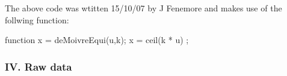 The above code was wtitten 15/10/07 by J Fenemore and makes use of the follwing function:
\begin{VrbM}
function x = deMoivreEqui(u,k);
%
%
%
%
%
x = ceil(k * u) ; %
\end{VrbM}
\subsubsection*{IV. Raw data}
